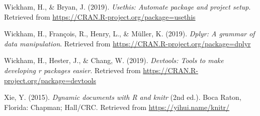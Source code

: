 \documentclass[man]{apa6}
\begin{document}
\hypertarget{ref-R-usethis}{}
Wickham, H., \& Bryan, J. (2019). \emph{Usethis: Automate package and
project setup}. Retrieved from
\url{https://CRAN.R-project.org/package=usethis}

\hypertarget{ref-R-dplyr}{}
Wickham, H., François, R., Henry, L., \& Müller, K. (2019). \emph{Dplyr:
A grammar of data manipulation}. Retrieved from
\url{https://CRAN.R-project.org/package=dplyr}

\hypertarget{ref-R-devtools}{}
Wickham, H., Hester, J., \& Chang, W. (2019). \emph{Devtools: Tools to
make developing r packages easier}. Retrieved from
\url{https://CRAN.R-project.org/package=devtools}

\hypertarget{ref-R-knitr}{}
Xie, Y. (2015). \emph{Dynamic documents with R and knitr} (2nd ed.).
Boca Raton, Florida: Chapman; Hall/CRC. Retrieved from
\url{https://yihui.name/knitr/}



\endgroup
\end{document}
